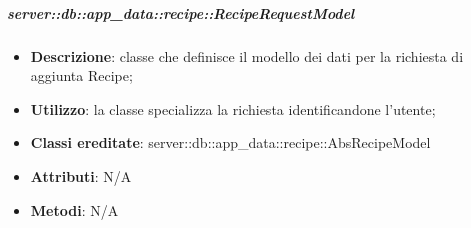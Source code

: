 		\subparagraph{server::db::app\_data::recipe::RecipeRequestModel} %
		\label{subp:server_db_app_data_recipe_reciperequestmodel}
			\begin{itemize}
				\item \textbf{Descrizione}: classe che definisce il modello dei dati per la richiesta di aggiunta Recipe;
				\item \textbf{Utilizzo}: la classe specializza la richiesta identificandone l'utente;
				\item \textbf{Classi ereditate}: server::db::app\_data::recipe::AbsRecipeModel
				\item \textbf{Attributi}: N/A
				\item \textbf{Metodi}: N/A
			\end{itemize}


